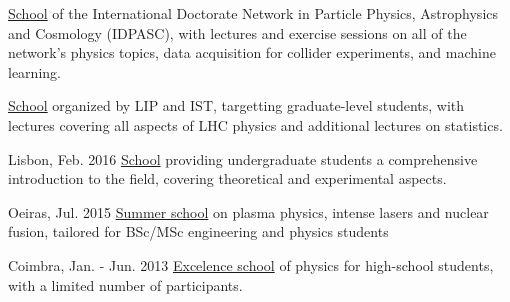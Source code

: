 \begin{cventries}
    
    {\href{https://indico.lip.pt/event/643}{School} of the International Doctorate Network in Particle Physics, Astrophysics and Cosmology (IDPASC), with lectures and exercise sessions on all of the network's physics topics, data acquisition for collider experiments, and machine learning.}

    {\href{https://indico.cern.ch/event/997566/}{School} organized by LIP and IST, targetting graduate-level students, with lectures covering all aspects of LHC physics and additional lectures on statistics.}

    {}{Lisbon, Feb. 2016}
    {\href{https://indico.lip.pt/event/206/}{School} providing undergraduate students a comprehensive introduction to the field, covering theoretical and experimental aspects.}

    {}{Oeiras, Jul. 2015}
    {\href{http://plasmasurf.tecnico.ulisboa.pt/index.html}{Summer school} on plasma physics, intense lasers and nuclear fusion, tailored for BSc/MSc engineering and physics students}

    {}{Coimbra, Jan. - Jun. 2013}
    {\href{https://quark.fis.uc.pt}{Excelence school} of physics for high-school students, with a limited number of participants.}

\end{cventries}